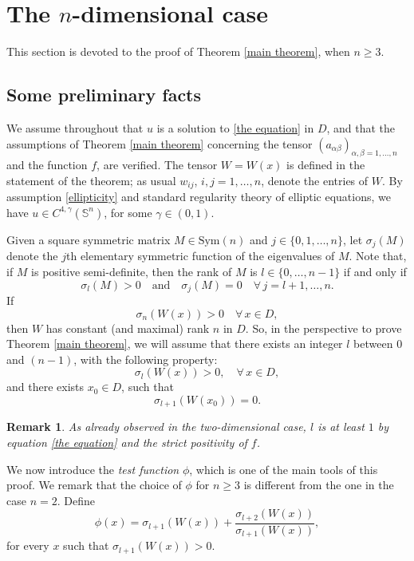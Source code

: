 \documentclass[12pt]{amsart}
\newtheorem{remark}[theorem]{Remark}
\newcommand{\1}{\mathbf 1}
\newcommand{\sfe}{{{\mathbb S}^{n}}}
\begin{document}
\section{The $n$-dimensional case}\label{section n general}

This section is devoted to the proof of Theorem \ref{main theorem}, when $n\ge3$.

\subsection{Some preliminary facts}\label{section preliminaries}
We assume throughout that $u$ is a solution to \eqref{the equation} in $D$, and that the assumptions of Theorem \ref{main theorem} concerning the tensor $(a_{\alpha\beta})_{\alpha,\beta=1,\dots,n}$ and the function $f$, are verified. The tensor $W=W(x)$ is defined in the statement of the theorem; as usual $w_{ij}$, $i,j=1,\dots,n$, denote the entries of $W$. By assumption \eqref{ellipticity} and standard regularity theory of elliptic equations, we have $u\in C^{4,\gamma}(\sfe)$, for some $\gamma\in(0,1)$. %


\medskip

Given a square symmetric matrix $M\in\mbox{Sym}(n)$ and $j\in\{0,1,\dots,n\}$, let $\sigma_j(M)$ denote the $j$th elementary symmetric function of the eigenvalues of $M$. Note that, if $M$ is positive semi-definite, then the rank of $M$ is $l\in\{0,\dots,n-1\}$ if and only if
$$
\sigma_l(M)>0\quad\mbox{and}\quad\sigma_j(M)=0\quad\forall\, j=l+1,\dots,n.
$$
If 
$$
\sigma_n(W(x))>0\quad\forall\, x\in D,
$$
then $W$ has constant (and maximal) rank $n$ in $D$. So, in the perspective to prove Theorem \ref{main theorem}, we will assume that there exists an integer $l$ between $0$ and $(n-1)$, with the following property:
$$
\sigma_l(W(x))>0,\quad\forall\, x\in D,
$$
and there exists $x_0\in D$, such that
$$
\sigma_{l+1}(W(x_0))=0.
$$

\begin{remark}\label{l bigger than one} As already observed in the two-dimensional case, $l$ is at least $1$ by equation \eqref{the equation} and the strict positivity of $f$.
\end{remark}

We now introduce the {\it test function} $\phi$, which is one of the main tools of this proof. We remark that the choice of $\phi$ for $n\ge3$ is different from the one in the case $n=2$. Define
\begin{equation}\label{newphi}
\phi(x)=\sigma_{l+1}(W(x))+\frac{\sigma_{l+2}(W(x))}{\sigma_{l+1}(W(x))},
\end{equation}
for every $x$ such that $\sigma_{l+1}(W(x))>0$. 
\end{document}
